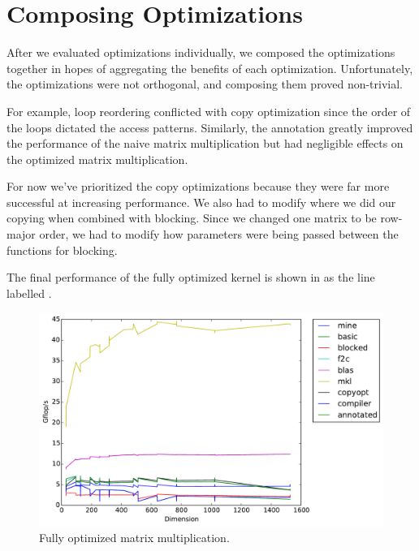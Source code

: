 \section{Composing Optimizations}\label{sec:composing}
After we evaluated optimizations individually, we composed the optimizations
together in hopes of aggregating the benefits of each optimization.
Unfortunately, the optimizations were not orthogonal, and composing them proved
non-trivial.

For example, loop reordering conflicted with copy optimization since the order
of the loops dictated the access patterns. Similarly, the 
annotation greatly improved the performance of the naive matrix multiplication
but had negligible effects on the optimized matrix multiplication.

For now we've prioritized the copy optimizations because they were far more
successful at increasing performance. We also had to modify where we did our
copying when combined with blocking. Since we changed one matrix to be
row-major order, we had to modify how parameters were being passed between the
functions for blocking.

The final performance of the fully optimized kernel is shown in
 as the line labelled .

\begin{figure}[h]
  \centering
  \includegraphics[width=\textwidth]{timing_composed.pdf}
  \caption{Fully optimized matrix multiplication.}
  \label{fig:composed}
\end{figure}
